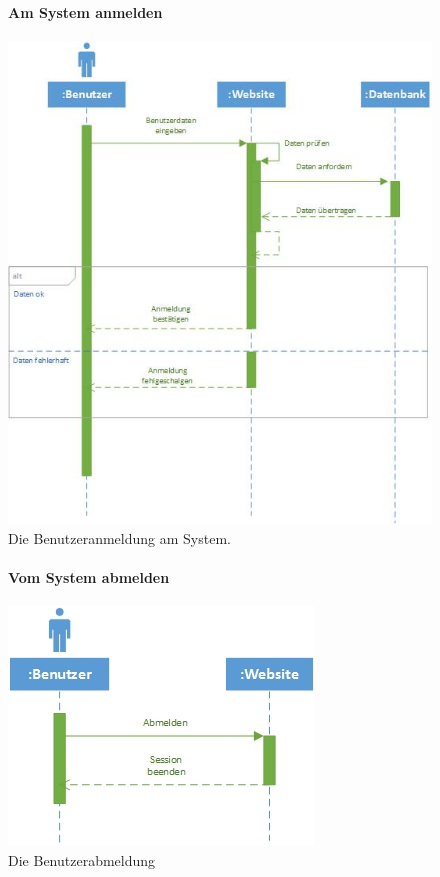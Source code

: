 \documentclass[12pt,a4paper]{article}
\begin{document}
\begin{figure}[H]
	\centering
	\paragraph{Am System anmelden}
	\includegraphics[width=\textwidth]{Bilder/Sequenzdiagramme/AmSystemAnmelden1.jpg}
	\caption{Die Benutzeranmeldung am System.}
	\label{SzAmSystemAnmelden}
\end{figure}
\begin{figure}[H]
	\centering
	\paragraph{Vom System abmelden}
	\includegraphics[width=\textwidth]{Bilder/Sequenzdiagramme/VomSystemAbmelden.jpg}
	\caption{Die Benutzerabmeldung}
	\label{SzVomSystemAbmelden}
\end{figure}
\end{document}
